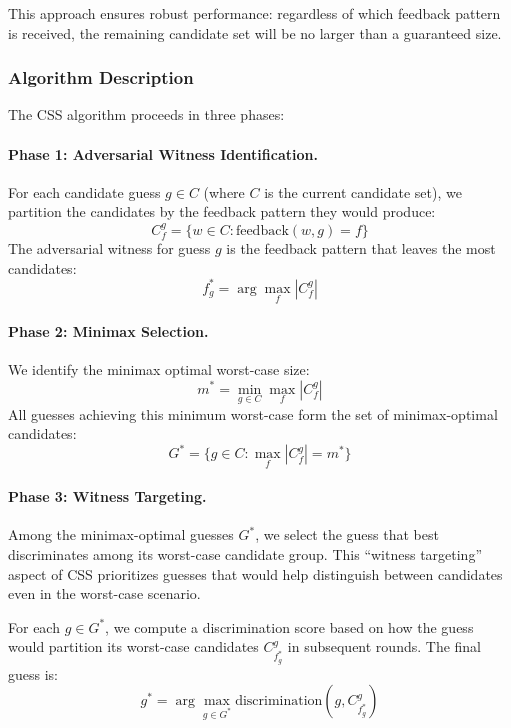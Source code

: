This approach ensures robust performance: regardless of which feedback pattern is received, the remaining candidate set will be no larger than a guaranteed size.

\subsubsection{Algorithm Description}

The CSS algorithm proceeds in three phases:

\paragraph{Phase 1: Adversarial Witness Identification.}
For each candidate guess $g \in C$ (where $C$ is the current candidate set), we partition the candidates by the feedback pattern they would produce:
\begin{equation}
C_f^g = \{w \in C : \text{feedback}(w, g) = f\}
\end{equation}
The adversarial witness for guess $g$ is the feedback pattern that leaves the most candidates:
\begin{equation}
f^*_g = \arg\max_f |C_f^g|
\end{equation}

\paragraph{Phase 2: Minimax Selection.}
We identify the minimax optimal worst-case size:
\begin{equation}
m^* = \min_{g \in C} \max_f |C_f^g|
\end{equation}
All guesses achieving this minimum worst-case form the set of minimax-optimal candidates:
\begin{equation}
G^* = \{g \in C : \max_f |C_f^g| = m^*\}
\end{equation}

\paragraph{Phase 3: Witness Targeting.}
Among the minimax-optimal guesses $G^*$, we select the guess that best discriminates among its worst-case candidate group. This ``witness targeting'' aspect of CSS prioritizes guesses that would help distinguish between candidates even in the worst-case scenario.

For each $g \in G^*$, we compute a discrimination score based on how the guess would partition its worst-case candidates $C_{f^*_g}^g$ in subsequent rounds. The final guess is:
\begin{equation}
g^* = \arg\max_{g \in G^*} \text{discrimination}(g, C_{f^*_g}^g)
\end{equation}

